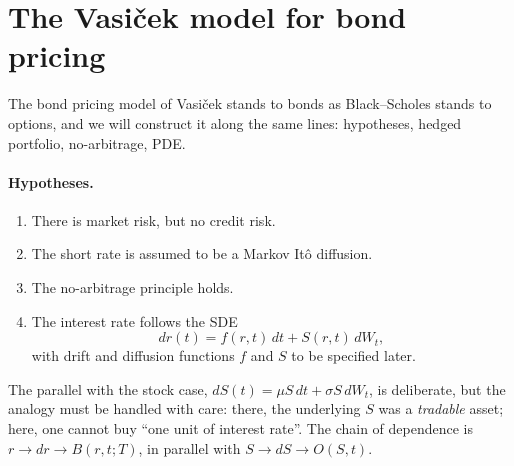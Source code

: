 \section{The Vasi\v{c}ek model for bond pricing}\label{sec:vasicek-model}

The bond pricing model of Vasi\v{c}ek\cite{Vasicek1977} stands to bonds as Black--Scholes stands to options, and we will construct it along the same lines: hypotheses, hedged portfolio, no-arbitrage, PDE.

\paragraph*{Hypotheses.}

\begin{enumerate}[label=(\roman*)]
    \item There is market risk, but no credit risk.
    \item The short rate is assumed to be a Markov It\^o diffusion.
    \item The no-arbitrage principle holds.
    \item The interest rate follows the SDE
    \begin{equation}\label{eq:rate-sde}
    dr(t) = f(r,t)\,dt + S(r,t)\, dW_t,
    \end{equation}
    with drift and diffusion functions $f$ and $S$ to be specified later.
\end{enumerate}
The parallel with the stock case, $dS(t) = \mu S\,dt + \sigma S\,dW_t$, is deliberate, but the analogy must be handled with care: there, the underlying $S$ was a \emph{tradable} asset; here, one cannot buy ``one unit of interest rate''.
The chain of dependence is $r \to dr \to B(r,t;T)$, in parallel with $S \to dS \to O(S,t)$.

